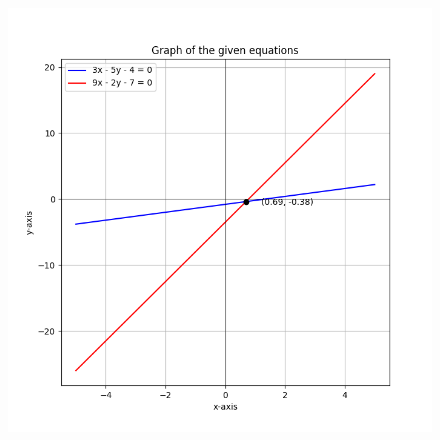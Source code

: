 \documentclass[journal]{IEEEtran}
\begin{document}
\begin{figure}[H]
\begin{center}
\includegraphics[width=0.8\columnwidth]{figs/fig.png}
\end{center}
\label{fig:Fig1}
\end{figure}
\end{document}
